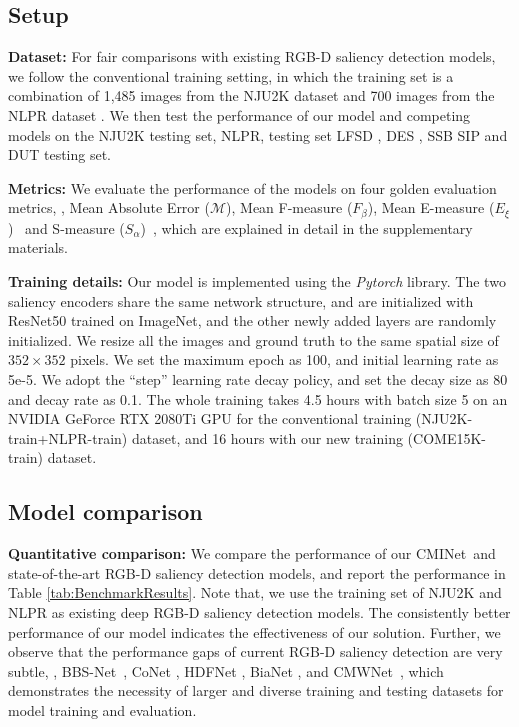 \documentclass[10pt,twocolumn,letterpaper]{article}
\def\ourmodel{CMINet}
\def\ourdataset{COME15K}
\begin{document}
\subsection{Setup}
\noindent\textbf{Dataset:} For fair comparisons with existing RGB-D saliency detection models, we follow the conventional training setting, in which the training set is a combination of 1,485 images from the NJU2K
dataset \cite{NJU2000} and 700 images from the NLPR dataset \cite{peng2014rgbd}. We then test the performance of our model and competing models on the NJU2K testing set, NLPR, testing set 
LFSD \cite{li2014saliency}, DES \cite{cheng2014depth}, SSB \cite{niu2012leveraging} SIP \cite{sip_dataset} and DUT \cite{dmra_iccv19} testing set.

\noindent\textbf{Metrics:} We evaluate the performance of the models on four golden evaluation metrics, \ie, Mean Absolute Error ($\mathcal{M}$), Mean F-measure ($F_{\beta}$), Mean E-measure ($E_{\xi}$)~\cite{Fan2018Enhanced} and S-measure ($S_{\alpha}$)~\cite{fan2017structure}, which are explained in detail in the supplementary materials.




\noindent\textbf{Training details:} Our model is implemented using the \textit{Pytorch} library.
The two saliency encoders share the same network structure, and are initialized with ResNet50 \cite{ResHe2015} trained on ImageNet, and the other newly added layers are randomly initialized. We resize all the images and ground truth to the same spatial size of $352\times352$ pixels. We set the maximum epoch as 100, and initial learning rate as 5e-5. We adopt the \enquote{step} learning rate decay policy, and set the decay size as 80 and decay rate as 0.1. The whole training takes 4.5 hours with batch size 5 on an NVIDIA GeForce RTX 2080Ti GPU for the conventional training (NJU2K-train+NLPR-train)
dataset, and 16 hours with our new training (\ourdataset-train)
dataset.

\subsection{Model comparison}
\noindent\textbf{Quantitative comparison:} We compare the performance of our \ourmodel~and state-of-the-art RGB-D saliency detection models, and report the performance in Table \ref{tab:BenchmarkResults}. Note that, we use the training set of NJU2K and NLPR as existing deep RGB-D saliency detection models. 
The consistently better performance of our model indicates the effectiveness of our solution.
Further, we observe that the performance gaps of current RGB-D saliency detection are very subtle, \eg, BBS-Net~\cite{fan2020bbs}, CoNet \cite{ji2020accurate}, HDFNet \cite{HDFNet-ECCV2020}, BiaNet \cite{zhang2020bilateral}, and CMWNet~\cite{zhang2020bilateral}, which demonstrates the
necessity of
larger and diverse training and testing datasets for model training and evaluation.
\end{document}
